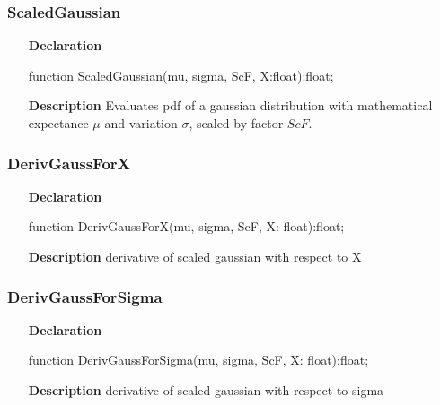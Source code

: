 \documentclass[12pt,a4paper,oneside]{report}
\newcommand{\declarationitem}[1]{\textbf{#1}}
\newcommand{\descriptiontitle}[1]{\textbf{#1}}
\begin{document}
\subsubsection{ScaledGaussian}
\label{ugauss-ScaledGaussian}
\begin{itemize}\item[\declarationitem{Declaration}\hfill]
	\begin{flushleft}
		\begin{ttfamily}
			function ScaledGaussian(mu, sigma, ScF, X:float):float;\end{ttfamily}
		
	\end{flushleft}
	
	\par
	\item[\descriptiontitle{Description}]
	Evaluates pdf of a gaussian distribution with mathematical expectance $\mu$ and variation $\sigma$, scaled by factor $ScF$.
\end{itemize}
\subsubsection{DerivGaussForX}
\label{ugauss-DerivGaussForX}
\begin{itemize}\item[\declarationitem{Declaration}\hfill]
	\begin{flushleft}
		\begin{ttfamily}
			function DerivGaussForX(mu, sigma, ScF, X: float):float;\end{ttfamily}
		
	\end{flushleft}
	
	\par
	\item[\descriptiontitle{Description}]
	derivative of scaled gaussian with respect to X
	
\end{itemize}
\subsubsection{DerivGaussForSigma}
\label{ugauss-DerivGaussForSigma}
\begin{itemize}\item[\declarationitem{Declaration}\hfill]
	\begin{flushleft}
		\begin{ttfamily}
			function DerivGaussForSigma(mu, sigma, ScF, X: float):float;\end{ttfamily}
		
	\end{flushleft}
	
	\par
	\item[\descriptiontitle{Description}]
	derivative of scaled gaussian with respect to sigma
	
\end{itemize}
\end{document}
